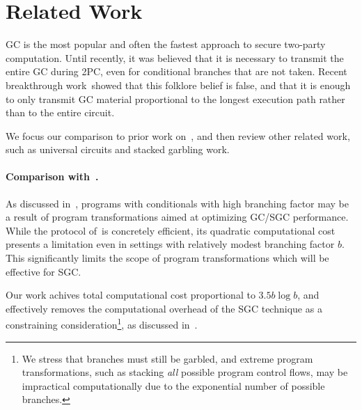 \section{Related Work}\label{sec:relwork}


GC is the most popular and often the fastest approach to secure two-party computation.  Until recently, it was believed that it is necessary
to transmit the entire GC during 2PC, even for conditional branches that
are not taken.  Recent breakthrough work~\HK showed that this folklore belief is false, and that  it is enough to only transmit GC material  proportional to the
longest execution path rather than to the entire circuit.

We focus our comparison to prior work on~\HK, and then review other related work, such as universal circuits and  stacked garbling work.


\paragraph{Comparison with~\HK.}
As discussed in~, programs with conditionals with high branching factor may be a result of program transformations aimed at optimizing GC/SGC performance.  
While the protocol of~\HK is concretely efficient, its quadratic computational cost presents a  limitation even in settings with  relatively  modest branching factor $b$.  This significantly limits the scope of program transformations which will be effective for SGC.


Our work achives total computational cost proportional to $3.5 b \log b$, and  effectively removes the computational overhead of the SGC technique as a constraining consideration\footnote{We stress that  branches must still be garbled, and extreme program transformations, such as stacking {\em all} possible program control flows, may be impractical computationally due to the exponential number of possible branches.}, as discussed in~. 

